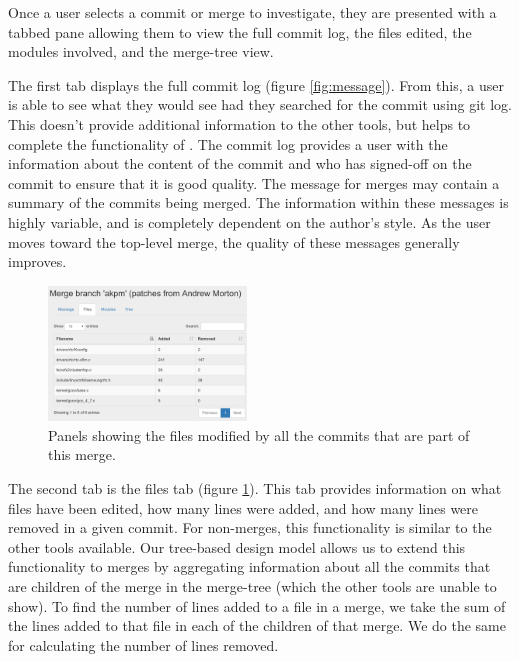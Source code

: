 \documentclass[conference, draftclsnofoot, draft]{IEEEtran}
\begin{document}
Once a user selects a commit or merge to investigate, they are presented with a
tabbed pane allowing them to view the full commit log, the files edited, the modules
involved, and the merge-tree view.

The first tab displays the full commit log (figure \ref{fig:message}). From this, a
user is able to see what they would see had they searched for the commit using git
log. This doesn't provide additional information to the other tools, but helps to
complete the functionality of \tool. The commit log provides a user with the
information about the content of the commit and who has signed-off on the commit to
ensure that it is good quality. The message for merges may contain a summary of the
commits being merged.  The information within these messages is highly variable, and
is completely dependent on the author's style. As the user moves toward the
top-level merge, the quality of these messages generally improves.

\begin{figure}
        \centering
        \includegraphics[width=0.47\textwidth]{figures/files_view_2.png}
        \caption{Panels showing the files modified by all the commits that are part of this merge.}
        \label{fig:files}
\end{figure}

The second tab is the files tab (figure \ref{fig:files}). This tab provides information on what files have been edited, how many lines were added, and how many
lines were removed in a given commit. For non-merges, this functionality is similar to the other tools available. Our tree-based design model allows us to
extend this functionality to merges by aggregating information about all the commits that are children of the merge in the merge-tree (which the other tools are
unable to show). To find the number of lines added to a file in a merge, we take the sum of the lines added to that file in each of the children of that
merge. We do the same for calculating the number of lines removed.
\end{document}
